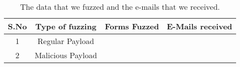 \begin{table}[!htbp]
	\centering
	\begin{tabular}{|c|c|c|c|}
		\hline
		\multicolumn{1}{|c|}{\textbf{S.No}} &
		\multicolumn{1}{c|}{\textbf{Type of fuzzing}} &
		\multicolumn{1}{c|}{\textbf{Forms Fuzzed}} &
		\multicolumn{1}{c|}{\textbf{E-Mails received}}\\
		\hline
		1 & Regular Payload & \fuzzed & \recd \\
		\hline
		2 & Malicious Payload & \malfuzzed & \success \\
		\hline
	\end{tabular}
	\caption[]{The data that we fuzzed and the e-mails that we received.}
	\label{tab:fuzzed_data}
\end{table}